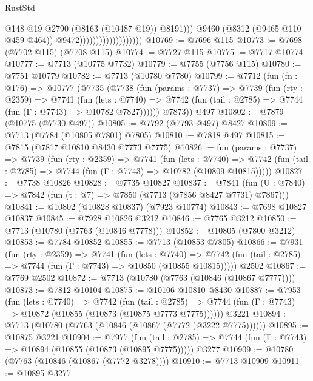 \begin{lexlean}{RustStd}
\begin{coremodule}
                                                @148
                                                @19
                                                @2790
                                                (@8163 (@10487 @19))
                                                @8191)))
                                          @9460
                                          (@8312 (@9465 @110 @459 @464))
                                          @9472)))))))))))))))))))
@10769 := @7696 @115
@10773 := @7698 (@7702 @115) (@7708 @115)
@10774 := @7727 @115
@10775 := @7717 @10774
@10777 := @7713 (@10775 @7732)
@10779 := @7755 (@7756 @115)
@10780 := @7751 @10779
@10782 := @7713 (@10780 @7780)
@10799 := @7712
    (fun (fn : @176) =>
    @10777
      (@7735
        (@7738
          (fun (params : @7737) =>
          @7739
            (fun (rty : @2359) =>
            @7741
              (fun (lets : @7740) =>
              @7742 (fun (tail : @2785) => @7744 (fun (Γ : @7743) => @10782 @7827))))))
        @7873))
    @497
@10802 := @7879 (@10775 (@7730 @497))
@10805 := @7792 (@7793 @497) @8427
@10809 := @7713 (@7784 (@10805 @7801) @7805)
@10810 := @7818 @497
@10815 := @7815 (@7817 @10810 @8430 @7773 @7775)
@10826 := fun (params : @7737) =>
  @7739
    (fun (rty : @2359) =>
    @7741
      (fun (lets : @7740) =>
      @7742 (fun (tail : @2785) => @7744 (fun (Γ : @7743) => @10782 (@10809 @10815)))))
@10827 := @7738 @10826
@10828 := @7735 @10827
@10837 := @7841 (fun (U : @7840) => @7842 (fun (t : @7) => @7850 (@7713 (@7856 @8427 @7731) @7867)))
@10841 := @10802 (@10828 @10837) (@7923 @10774)
@10843 := @7698 @10827 @10837
@10845 := @7928 @10826 @3212
@10846 := @7765 @3212
@10850 := @7713 (@10780 (@7763 (@10846 @7778)))
@10852 := @10805 (@7800 @3212)
@10853 := @7784 @10852
@10855 := @7713 (@10853 @7805)
@10866 := @7931
    (fun (rty : @2359) =>
    @7741
      (fun (lets : @7740) =>
      @7742 (fun (tail : @2785) => @7744 (fun (Γ : @7743) => @10850 (@10855 @10815)))))
    @2502
@10867 := @7769 @2502
@10872 := @7713 (@10780 (@7763 (@10846 (@10867 @7777))))
@10873 := @7812 @10104
@10875 := @10106 @10810 @8430
@10887 := @7953
    (fun (lets : @7740) =>
    @7742
      (fun (tail : @2785) =>
      @7744 (fun (Γ : @7743) => @10872 (@10855 (@10873 (@10875 @7773 @7775))))))
    @3221
@10894 := @7713 (@10780 (@7763 (@10846 (@10867 (@7772 (@3222 @7775))))))
@10895 := @10875 @3221
@10904 := @7977
    (fun (tail : @2785) => @7744 (fun (Γ : @7743) => @10894 (@10855 (@10873 (@10895 @7775)))))
    @3277
@10909 := @10780 (@7763 (@10846 (@10867 (@7772 @3278))))
@10910 := @7713 @10909
@10911 := @10895 @3277

\end{coremodule}
\end{lexlean}
